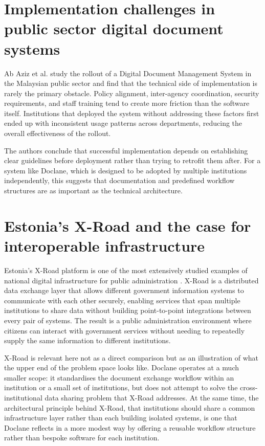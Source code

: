 
\section{Implementation challenges in public sector digital document systems}

\par Ab Aziz et al. \cite{abaziz2019ddms} study the rollout of a Digital Document Management System in the Malaysian public sector and find that the technical side of implementation is rarely the primary obstacle. Policy alignment, inter-agency coordination, security requirements, and staff training tend to create more friction than the software itself. Institutions that deployed the system without addressing these factors first ended up with inconsistent usage patterns across departments, reducing the overall effectiveness of the rollout.

\par The authors conclude that successful implementation depends on establishing clear guidelines before deployment rather than trying to retrofit them after. For a system like Doclane, which is designed to be adopted by multiple institutions independently, this suggests that documentation and predefined workflow structures are as important as the technical architecture.


\section{Estonia's X-Road and the case for interoperable infrastructure}

\par Estonia's X-Road platform is one of the most extensively studied examples of national digital infrastructure for public administration \cite{xroad2016}. X-Road is a distributed data exchange layer that allows different government information systems to communicate with each other securely, enabling services that span multiple institutions to share data without building point-to-point integrations between every pair of systems. The result is a public administration environment where citizens can interact with government services without needing to repeatedly supply the same information to different institutions.

\par X-Road is relevant here not as a direct comparison but as an illustration of what the upper end of the problem space looks like. Doclane operates at a much smaller scope: it standardises the document exchange workflow within an institution or a small set of institutions, but does not attempt to solve the cross-institutional data sharing problem that X-Road addresses. At the same time, the architectural principle behind X-Road, that institutions should share a common infrastructure layer rather than each building isolated systems, is one that Doclane reflects in a more modest way by offering a reusable workflow structure rather than bespoke software for each institution.

